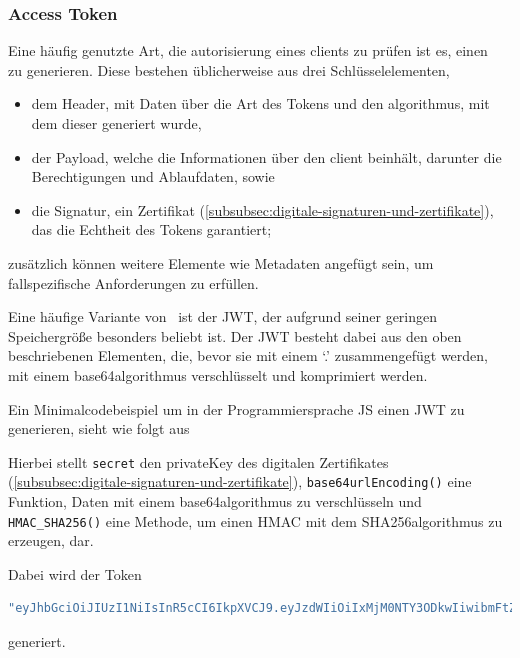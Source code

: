 \subsubsection[Access Token]{Access Token}\label{subsubsec:access-token}
Eine häufig genutzte Art, die \gls{autorisierung} eines \glspl{client} zu prüfen ist es, einen\  zu generieren.
Diese bestehen üblicherweise aus drei Schlüsselelementen,
\begin{itemize}
    \item dem Header, mit Daten über die Art des Tokens und den \gls{algorithmus}, mit dem dieser generiert wurde,
    \item der Payload, welche die Informationen über den \gls{client} beinhält, darunter \ua die Berechtigungen und Ablaufdaten, sowie
    \item die Signatur, ein Zertifikat (\autoref{subsubsec:digitale-signaturen-und-zertifikate}), das die Echtheit des Tokens garantiert;
\end{itemize}\label{itm:TokenElemente}
zusätzlich können weitere Elemente wie \zb Metadaten angefügt sein, um fallspezifische Anforderungen zu erfüllen.\autocite[\vglf][]{AccessTo39:online}

Eine häufige Variante von\  ist der \ac{JWT}, der aufgrund seiner geringen Speichergröße besonders beliebt ist.\autocite[\vglf][]{rfc7519} Der \ac{JWT} besteht dabei aus den oben beschriebenen Elementen, die, bevor sie mit einem `.' zusammengefügt werden, mit einem \gls{base64}\nonbreakdash \gls{algorithmus} verschlüsselt und komprimiert werden.\autocite[\vglf][]{rfc7519}

Ein Minimalcodebeispiel um in der Programmiersprache \ac{JS} einen \ac{JWT} zu generieren, sieht wie folgt aus



Hierbei stellt \lstinline!secret! den \gls{privateKey} des digitalen Zertifikates (\autoref{subsubsec:digitale-signaturen-und-zertifikate}), \lstinline!base64urlEncoding()! eine Funktion, Daten mit einem \gls{base64}\nonbreakdash \gls{algorithmus} zu verschlüsseln und \lstinline!HMAC_SHA256()! eine Methode, um einen \ac{HMAC} mit dem \gls{SHA256}\nonbreakdash\gls{algorithmus} zu erzeugen, dar.

Dabei wird der Token
\begin{lstlisting}[language = JavaScript,label={lst:jwt}]
"eyJhbGciOiJIUzI1NiIsInR5cCI6IkpXVCJ9.eyJzdWIiOiIxMjM0NTY3ODkwIiwibmFtZSI6IkpvaG4gRG9lIiwiaWF0IjoxNTE2MjM5MDIyfQ.SflKxwRJSMeKKF2QT4fwpMeJf36POk6yJV_adQssw5c"
\end{lstlisting}
generiert.

